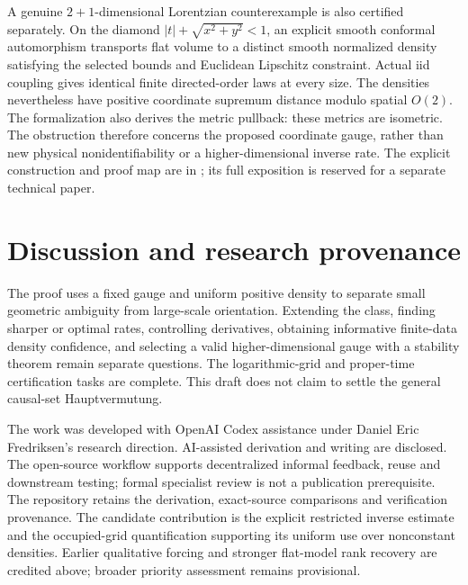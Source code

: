 \documentclass[11pt]{article}
\theoremstyle{remark}
\begin{document}
A genuine $2+1$-dimensional Lorentzian counterexample is also certified
separately. On the diamond $|t|+\sqrt{x^2+y^2}<1$, an explicit smooth
conformal automorphism transports flat volume to a distinct smooth
normalized density satisfying the selected bounds and Euclidean
Lipschitz constraint. Actual iid coupling gives identical finite
directed-order laws at every size. The densities nevertheless have
positive coordinate supremum distance modulo spatial $O(2)$.
The formalization also derives the metric pullback: these metrics
are isometric. The obstruction therefore concerns the proposed
coordinate gauge, rather than new physical nonidentifiability or a
higher-dimensional inverse rate. The explicit construction and proof
map are in ; its
full exposition is reserved for a separate technical paper.

\section{Discussion and research provenance}
The proof uses a fixed gauge and uniform positive density to separate
small geometric ambiguity from large-scale orientation. Extending
the class, finding sharper or optimal rates, controlling derivatives,
obtaining informative finite-data density confidence, and selecting a
valid higher-dimensional gauge with a stability theorem remain separate
questions. The logarithmic-grid and proper-time certification tasks
are complete. This draft
does not claim to settle the general causal-set Hauptvermutung.

The work was developed with OpenAI Codex assistance under Daniel Eric
Fredriksen's research direction. AI-assisted derivation and writing are
disclosed. The open-source workflow supports decentralized informal
feedback, reuse and downstream testing; formal specialist review is
not a publication prerequisite. The repository retains the derivation, exact-source
comparisons and verification provenance. The candidate contribution
is the explicit restricted inverse estimate and the occupied-grid
quantification supporting its uniform use over nonconstant densities.
Earlier qualitative forcing and stronger flat-model rank recovery are
credited above; broader priority assessment remains provisional.
\end{document}

